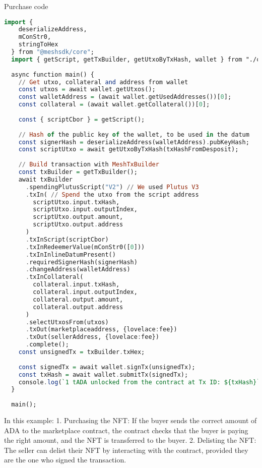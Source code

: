 Purchase code


\begin{lstlisting}[language=haskell, caption=Delisting or Purchasing an NFT using MeshJS]
  import { 
    deserializeAddress, 
    mConStr0, 
    stringToHex 
  } from "@meshsdk/core";
  import { getScript, getTxBuilder, getUtxoByTxHash, wallet } from "./common";
  
  async function main() {
    // Get utxo, collateral and address from wallet
    const utxos = await wallet.getUtxos();
    const walletAddress = (await wallet.getUsedAddresses())[0];
    const collateral = (await wallet.getCollateral())[0];
  
    const { scriptCbor } = getScript();
  
    // Hash of the public key of the wallet, to be used in the datum
    const signerHash = deserializeAddress(walletAddress).pubKeyHash;
    const scriptUtxo = await getUtxoByTxHash(txHashFromDesposit);
  
    // Build transaction with MeshTxBuilder
    const txBuilder = getTxBuilder();
    await txBuilder
      .spendingPlutusScript("V2") // We used Plutus V3
      .txIn( // Spend the utxo from the script address
        scriptUtxo.input.txHash,
        scriptUtxo.input.outputIndex,
        scriptUtxo.output.amount,
        scriptUtxo.output.address
      )
      .txInScript(scriptCbor)
      .txInRedeemerValue(mConStr0([0])) 
      .txInInlineDatumPresent()
      .requiredSignerHash(signerHash)
      .changeAddress(walletAddress)
      .txInCollateral(
        collateral.input.txHash,
        collateral.input.outputIndex,
        collateral.output.amount,
        collateral.output.address
      )
      .selectUtxosFrom(utxos)
      .txOut(marketplaceaddress, {lovelace:fee})
      .txOut(sellerAddress, {lovelace:fee})
      .complete();
    const unsignedTx = txBuilder.txHex;
  
    const signedTx = await wallet.signTx(unsignedTx);
    const txHash = await wallet.submitTx(signedTx);
    console.log(`1 tADA unlocked from the contract at Tx ID: ${txHash}`);
  }
  
  main();
  \end{lstlisting}


In this example:
1. Purchasing the NFT: If the buyer sends the correct amount of ADA to the marketplace contract, the contract checks that the buyer is paying the right amount, and the NFT is transferred to the buyer.
2. Delisting the NFT: The seller can delist their NFT by interacting with the contract, provided they are the one who signed the transaction.

